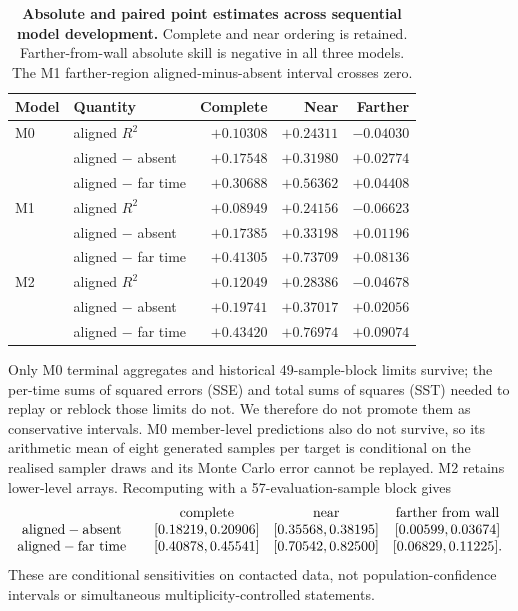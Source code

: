 \documentclass[11pt]{article}
\begin{document}
\begin{table}[h]
\centering
\small
\begin{tabular}{@{}llrrr@{}}
\toprule
Model & Quantity & Complete & Near & Farther \\
\midrule
M0 & aligned $R^2$ & $+0.10308$ & $+0.24311$ & $-0.04030$ \\
   & aligned $-$ absent & $+0.17548$ & $+0.31980$ & $+0.02774$ \\
   & aligned $-$ far time & $+0.30688$ & $+0.56362$ & $+0.04408$ \\
\addlinespace
M1 & aligned $R^2$ & $+0.08949$ & $+0.24156$ & $-0.06623$ \\
   & aligned $-$ absent & $+0.17385$ & $+0.33198$ & $+0.01196$ \\
   & aligned $-$ far time & $+0.41305$ & $+0.73709$ & $+0.08136$ \\
\addlinespace
M2 & aligned $R^2$ & $+0.12049$ & $+0.28386$ & $-0.04678$ \\
   & aligned $-$ absent & $+0.19741$ & $+0.37017$ & $+0.02056$ \\
   & aligned $-$ far time & $+0.43420$ & $+0.76974$ & $+0.09074$ \\
\bottomrule
\end{tabular}
\caption{\textbf{Absolute and paired point estimates across sequential model development.}
Complete and near ordering is retained. Farther-from-wall absolute skill is negative in all three
models. The M1 farther-region
aligned-minus-absent interval crosses zero.}
\end{table}

Only M0 terminal aggregates and historical 49-sample-block limits survive; the per-time sums of
squared errors (SSE) and total sums of squares (SST) needed to replay or reblock those limits do
not. We therefore do not promote them as
conservative intervals. M0 member-level predictions also do not survive, so its arithmetic mean of
eight generated samples per target is conditional on the realised sampler draws and its Monte
Carlo error cannot be replayed. M2 retains lower-level arrays. Recomputing with a 57-evaluation-sample
block gives
\[
\begin{array}{c@{\qquad}ccc}
 & \text{complete} & \text{near} & \text{farther from wall}\\
\text{aligned}-\text{absent}
& [0.18219,0.20906] & [0.35568,0.38195] & [0.00599,0.03674]\\
\text{aligned}-\text{far time}
& [0.40878,0.45541] & [0.70542,0.82500] & [0.06829,0.11225].
\end{array}
\]
These are conditional sensitivities on contacted data, not population-confidence intervals or
simultaneous multiplicity-controlled statements.
\end{document}
